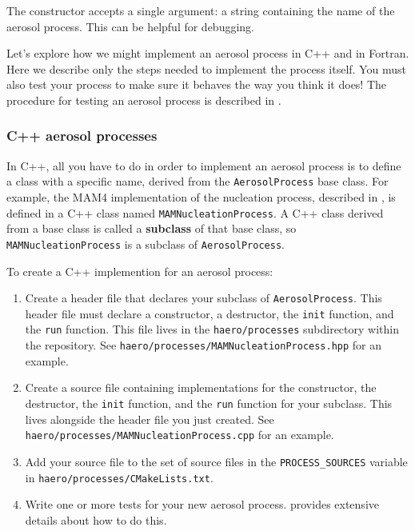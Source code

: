 The constructor accepts a single argument: a string containing the name of the
aerosol process. This can be helpful for debugging.

Let's explore how we might implement an aerosol process in C++ and in Fortran.
Here we describe only the steps needed to implement the process itself. You must
also test your process to make sure it behaves the way you think it does! The
procedure for testing an aerosol process is described in
.

\subsubsection{C++ aerosol processes}

In C++, all you have to do in order to implement an aerosol process is to define
a class with a specific name, derived from the \texttt{AerosolProcess} base
class. For example, the MAM4 implementation of the nucleation process, described
in , is defined in a C++ class named
\texttt{MAMNucleationProcess}. A C++ class derived from a base class is called a
{\bf subclass} of that base class, so \texttt{MAMNucleationProcess} is a
subclass of \texttt{AerosolProcess}.

To create a C++ implemention for an aerosol process:

\begin{enumerate}
  \item Create a header file that declares your subclass of
        \texttt{AerosolProcess}. This header file must declare a constructor,
        a destructor, the \texttt{init} function, and the \texttt{run} function.
        This file lives in the \texttt{haero/processes} subdirectory within the
        repository. See \texttt{haero/processes/MAMNucleationProcess.hpp} for an
        example.
  \item Create a source file containing implementations for the constructor, the
        destructor, the \texttt{init} function, and the \texttt{run} function for
        your subclass. This lives alongside the header file you just created.
        See \texttt{haero/processes/MAMNucleationProcess.cpp} for an example.
  \item Add your source file to the set of source files in the
        \texttt{PROCESS\_SOURCES} variable in \texttt{haero/processes/CMakeLists.txt}.
  \item Write one or more tests for your new aerosol process.
         provides extensive details about how to do this.
\end{enumerate}


